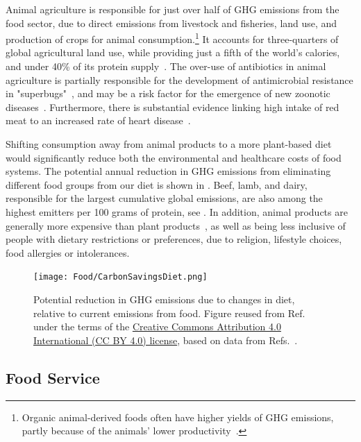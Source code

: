 \documentclass[../SustainableHEP.tex]{subfiles}
\begin{document}
Animal agriculture is responsible for just over half  of GHG emissions from the food sector, due to direct emissions from livestock and fisheries, land use, and production of crops for animal consumption.\footnote{Organic animal-derived foods often have higher yields of GHG emissions, partly because of the animals' lower productivity~\cite{Pieper2020}.}  It accounts for three-quarters of global agricultural land use, while providing just a fifth of the world's calories, and under 40\% of its protein supply~\cite{OWID-Food, PooreNemecek2018, Xu2021}.  The over-use of antibiotics in animal agriculture is partially responsible for the development of antimicrobial resistance in "superbugs"~\cite{AMBR2005}, and may be a risk factor for the emergence of new zoonotic diseases~\cite{Jones8399, Espinosa, Morand}.  Furthermore, there is substantial evidence linking high intake of red meat to an increased rate of heart disease~\cite{meat-health}.

Shifting consumption away from animal products to a more plant-based diet would significantly reduce both the environmental and healthcare costs of food systems.  
The potential annual reduction in GHG emissions from eliminating different food groups from our diet is shown in .  
Beef, lamb, and dairy, responsible for the largest cumulative global emissions, are also among the highest emitters per 100 grams of protein, see .  In addition, animal products are generally more expensive than plant products~\cite{Springmann2021}, as well as being less inclusive of people with dietary restrictions or preferences, due to religion, lifestyle choices, food allergies or intolerances.

\begin{figure}[tb]
    \centering
    \texttt{[image: Food/CarbonSavingsDiet.png]}
    \caption[Annual carbon opportunity due to changes in diet]{Potential reduction in GHG emissions due to changes in diet, relative to current emissions from food.  Figure reused from Ref.~\cite{OWID-CarbonOpportunity} under the terms of the \href{https://creativecommons.org/licenses/by/4.0/}{Creative Commons Attribution 4.0 International (CC BY 4.0) license}, based on data from Refs.~\cite{PooreNemecek2018,Schmidinger}.
    \label{fig:foodchanges}}
\end{figure}


\subsection{Food Service}
\end{document}
